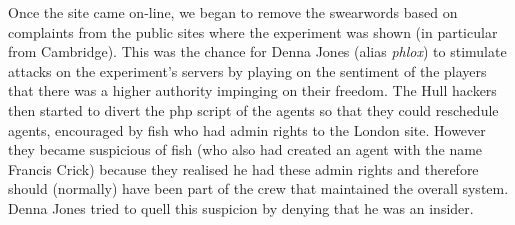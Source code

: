 Once the site came on-line, we began to remove the swearwords based on complaints from the public sites where the 
experiment was shown (in particular from Cambridge). This was the chance for Denna Jones (alias {\itshape phlox}) to stimulate 
attacks on the experiment's servers by playing on the sentiment of the players that there was a higher authority 
impinging on their freedom. The Hull hackers then started to divert the php script of the agents so that they 
could reschedule agents, encouraged by fish who had admin rights to the London site. However they became suspicious
of fish (who also had created an agent with the name Francis Crick)
because they realised he had these admin rights and therefore should (normally) have been part of the 
crew that maintained the overall system. Denna Jones tried to quell this suspicion by denying that he was an insider. 

